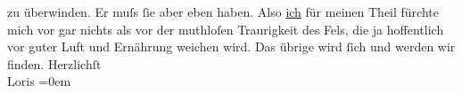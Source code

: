 \begin{ledgroupsized}[t]{13cm}
                    zu überwinden. Er muſs ſie aber eben haben. Also \uline{ich} für meinen Theil fürchte mich vor gar nichts als vor der muthloſen
                        {\pb}Traurigkeit des Fels, die ja hoffentlich vor guter Luft und
                    Ernährung weichen wird. Das übrige wird ſich und werden wir finden.\pend
           \pstart
           Herzlichſt{\\[\baselineskip]}\spacefill\mbox{Loris}\pend
           \leftskip=0em{}          \endnumbering{}\end{ledgroupsized}  \newcommand{\dateiname}{L00179}\newcommand{\titel}{Hugo von Hofmannsthal an Arthur Schnitzler, [18. 2. 1893]}\newcommand{\editorInnen}{ Martin Anton Müller und Gerd-Hermann Susen}
      